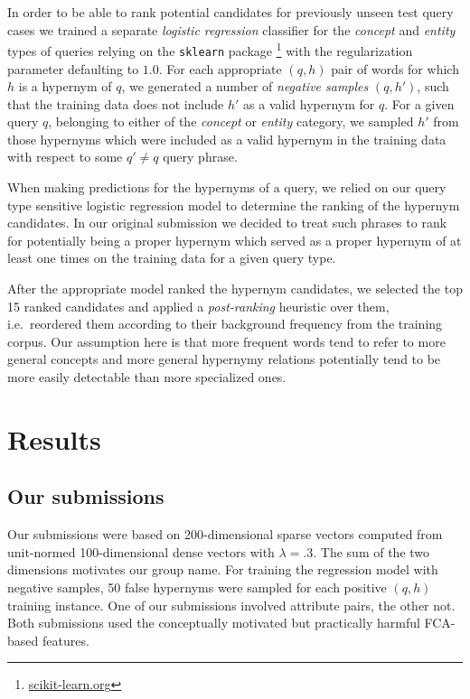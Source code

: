 \documentclass[11pt,a4paper]{article}
\begin{document}
In order to be able to rank potential candidates for previously unseen test
query cases we trained a separate \emph{logistic regression} classifier for the
\textit{concept} and \textit{entity} types of queries relying on the
\texttt{sklearn} package
\citep{Pedregosa:2011}\footnote{\url{scikit-learn.org}} with the regularization parameter defaulting to $1.0$.
For each appropriate $(q,h)$ pair of words for which
$h$ is a hypernym of $q$, we generated a number of \emph{negative samples} $(q, h')$,
such that the training data does not include $h'$ as a valid hypernym for $q$.
For a given query $q$, belonging to either of the \textit{concept} or
\textit{entity} category, we sampled $h'$ from those hypernyms which were
included as a valid hypernym in the training data with respect to some $q' \neq
q$ query phrase.

When making predictions for the hypernyms of a query, we relied on our query
type sensitive logistic regression model to determine the ranking of the
hypernym candidates. In our original submission we decided to treat such
phrases to rank for potentially being a proper hypernym which served as a
proper hypernym of at least one times on the training data for a given query
type.

After the appropriate model ranked the hypernym candidates, we selected
the top 15 ranked candidates and applied a \emph{post-ranking} heuristic over them,
i.e.~reordered them according to their background frequency from the training
corpus. Our assumption here is that more frequent words tend to refer to more
general concepts and more general hypernymy relations potentially tend to be
more easily detectable than more specialized ones.

\section{Results} \label{sec:results}

\subsection{Our submissions}

Our submissions were based on 200-dimensional sparse vectors computed from
unit-normed 100-dimensional dense vectors with $\lambda=.3$. The sum of the two
dimensions motivates our group name. For training the regression model with
negative samples, 50 false hypernyms were sampled for each positive $(q,h)$ 
training instance. One
of our submissions involved attribute pairs, the other not. Both
submissions used the conceptually motivated but practically harmful FCA-based
features.
\end{document}
